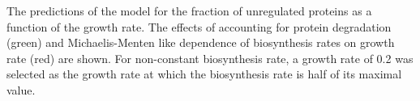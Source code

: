 \label{fig:theoreticalpred}
The predictions of the model for the fraction of unregulated proteins as a function of the growth rate.
The effects of accounting for protein degradation (green) and Michaelis-Menten like dependence of biosynthesis rates on growth rate (red) are shown.
For non-constant biosynthesis rate, a growth rate of 0.2 was selected as the growth rate at which the biosynthesis rate is half of its maximal value.